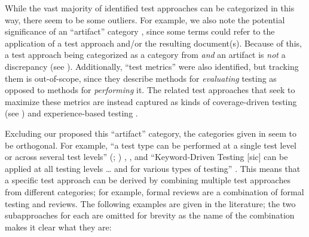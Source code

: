 While the vast majority of identified test approaches can be categorized
in this way, \ifnotpaper there seem to be some outliers. For example, \fi
we also note the potential significance of an ``artifact'' category%
, since some terms could refer to the application of
a test approach and/or the resulting document(s). Because of this, a test
approach being categorized as a category from 
\emph{and} an artifact is \emph{not} a discrepancy
(see ). \ifnotpaper
    Additionally, ``test metrics'' were also identified,
    but tracking them is out-of-scope, since they describe methods for
    \emph{evaluating} testing as opposed to methods for \emph{performing} it.
    The related test approaches that seek to maximize these metrics are instead
    captured as kinds of coverage-driven testing (see ) and
    experience-based testing \citep[p.~34]{IEEE2022}.

\fi
Excluding \ifnotpaper our proposed \else this \fi ``artifact'' category, the
categories given in  seem to be orthogonal. For
example, ``a test type can be performed at a single test level or across
several test levels''
\ifnotpaper
    (\citealp[p.~15]{IEEE2022}; \citeyear[p.~7]{IEEE2021})%
\else
    \cite[p.~15]{IEEE2022}, \cite[p.~7]{IEEE2021}%
\fi, and ``Keyword-Driven Testing [sic] can be applied at all testing levels
\dots{} and for various types of testing'' \citeyearpar[p.~4]{IEEE2016}.
This means that a specific test approach can be derived by combining multiple
test approaches from different categories; for example, formal reviews are a
combination of formal testing and reviews. \ifnotpaper The following examples
    are given in the literature; the two subapproaches for each are omitted
    for brevity as the name of the combination makes it clear what they are:

